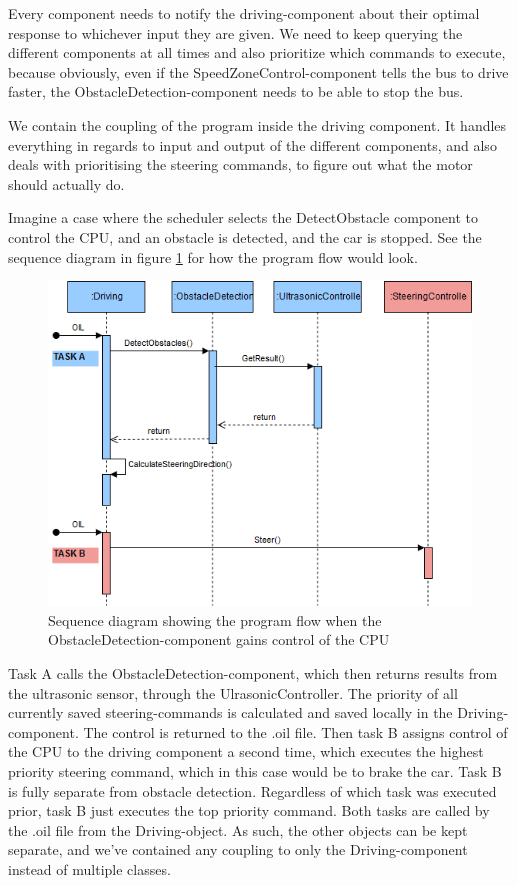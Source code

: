 Every component needs to notify the driving-component about their optimal response to whichever input they are given. 
We need to keep querying the different components at all times and also prioritize which commands to execute, because obviously, even if the SpeedZoneControl-component tells the bus to drive faster, the ObstacleDetection-component needs to be able to stop the bus. 


We contain the coupling of the program inside the driving component. It handles everything in regards to input and output of the different components, and also deals with prioritising the steering commands, to figure out what the motor should actually do. 

Imagine a case where the scheduler selects the DetectObstacle component to control the CPU, and an obstacle is detected, and the car is stopped. See the sequence diagram in figure \ref{fig:sequenceDetectObstacle} for how the program flow would look.

\begin{figure}[ht]
    \includegraphics[width=\textwidth]{Images/Design/sequenceObstacleDetection.png}
    \caption{Sequence diagram showing the program flow when the ObstacleDetection-component gains control of the CPU}
    \label{fig:sequenceDetectObstacle}
\end{figure}

Task A calls the ObstacleDetection-component, which then returns results from the ultrasonic sensor, through the UlrasonicController. The priority of all currently saved steering-commands is calculated and saved locally in the Driving-component. The control is returned to the .oil file. Then task B assigns control of the CPU to the driving component a second time, which executes the highest priority steering command, which in this case would be to brake the car. Task B is fully separate from obstacle detection. Regardless of which task was executed prior, task B just executes the top priority command. Both tasks are called by the .oil file from the Driving-object. As such, the other objects can be kept separate, and we've contained any coupling to only the Driving-component instead of multiple classes. 

